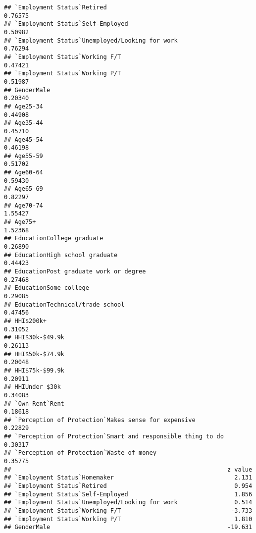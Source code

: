 \documentclass[]{article}
\begin{document}
\begin{verbatim}
## `Employment Status`Retired                                     0.76575
## `Employment Status`Self-Employed                               0.50982
## `Employment Status`Unemployed/Looking for work                 0.76294
## `Employment Status`Working F/T                                 0.47421
## `Employment Status`Working P/T                                 0.51987
## GenderMale                                                     0.20340
## Age25-34                                                       0.44908
## Age35-44                                                       0.45710
## Age45-54                                                       0.46198
## Age55-59                                                       0.51702
## Age60-64                                                       0.59430
## Age65-69                                                       0.82297
## Age70-74                                                       1.55427
## Age75+                                                         1.52368
## EducationCollege graduate                                      0.26890
## EducationHigh school graduate                                  0.44423
## EducationPost graduate work or degree                          0.27468
## EducationSome college                                          0.29085
## EducationTechnical/trade school                                0.47456
## HHI$200k+                                                      0.31052
## HHI$30k-$49.9k                                                 0.26113
## HHI$50k-$74.9k                                                 0.20048
## HHI$75k-$99.9k                                                 0.20911
## HHIUnder $30k                                                  0.34083
## `Own-Rent`Rent                                                 0.18618
## `Perception of Protection`Makes sense for expensive            0.22829
## `Perception of Protection`Smart and responsible thing to do    0.30317
## `Perception of Protection`Waste of money                       0.35775
##                                                             z value
## `Employment Status`Homemaker                                  2.131
## `Employment Status`Retired                                    0.954
## `Employment Status`Self-Employed                              1.856
## `Employment Status`Unemployed/Looking for work                0.514
## `Employment Status`Working F/T                               -3.733
## `Employment Status`Working P/T                                1.810
## GenderMale                                                  -19.631

\end{verbatim}
\end{document}
